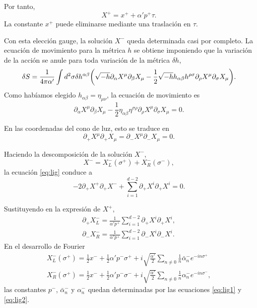 Por tanto, 
\begin{equation}
  X^+ = x^+ + \alpha' p^+ \tau.
\end{equation}
La constante $x^+$ puede eliminarse mediante una traslación en $\tau$.

Con esta elección gauge, la solución $X^-$ queda determinada casi por completo.
La ecuación de movimiento para la métrica $h$ se obtiene imponiendo que la variación de la acción
se anule para toda variación de la métrica $\delta h$,
\begin{equation}
  \delta S = \frac{1}{4\pi\alpha'}\int d^2\sigma \delta h^{\alpha\beta}
  \qty(
  \sqrt{-h}\partial_\alpha X^\mu \partial_\beta X_\mu -
  \frac 1 2 \sqrt{-h}h_{\alpha\beta}h^{\rho\sigma} \partial_\rho X^\mu \partial_\sigma X_\mu).
\end{equation}
Como habíamos elegido $h_{\alpha\beta}=\eta_{\mu\nu}$, la ecuación de movimiento es
\begin{equation}
  \partial_\alpha X^\mu \partial_\beta X_\mu - \frac 1 2 \eta_{\alpha\beta} \eta^{\sigma\rho} 
  \partial_\rho X^\mu  \partial_\sigma X_\mu = 0.
\end{equation}

En las coordenadas del cono de luz, esto se traduce en
\begin{equation}
  \partial_+ X^\mu \partial_+ X_\mu = \partial_- X^\mu \partial_- X_\mu = 0.
  \label{eq:lig}
\end{equation}

Haciendo la descomposición de la solución $X^-$,
\begin{equation}
  X^-=X^-_L(\sigma^+)+X^-_R(\sigma^-),
\end{equation}
la ecuación \ref{eq:lig} conduce a 
\begin{equation}
  -2\partial_+ X^+ \partial_+ X^- + \sum_{i=1}^{d-2} \partial_+ X^i \partial_+ X^i = 0.
\end{equation}

Sustituyendo en la expresión de $X^+$,
\begin{align}
  \partial_+ X_L^- = \frac{1}{\alpha'p^+}\sum_{i=1}^{d-2} \partial_+ X^i \partial_+ X^i, \label{eq:lig1}\\
  \partial_- X_R^- = \frac{1}{\alpha'p^+}\sum_{i=1}^{d-2} \partial_- X^i \partial_- X^i. \label{eq:lig2}
\end{align}
En el desarrollo de Fourier
\begin{equation}
  \begin{gathered}
    X^-_L(\sigma^+)=\frac 1 2 x^- + \frac 1 2 \alpha' p^- \sigma^+ + i\sqrt{\frac{ \alpha'}{ 2}}
    \sum_{n\neq0} \frac 1 n \bar{\alpha}^-_n e^{-in\sigma^+} \\                             
    X^-_R(\sigma^+)=\frac 1 2 x^- + \frac 1 2 \alpha' p^- \sigma^- + i\sqrt{\frac{ \alpha'}{ 2}}
    \sum_{n\neq0} \frac 1 n \alpha^-_n e^{-in\sigma^-},
  \end{gathered}
\end{equation}
las constantes $p^-$, $\bar \alpha^-_n$ y $\alpha^-_n$ quedan determinadas por las ecuaciones
\ref{eq:lig1} y \ref{eq:lig2}.

